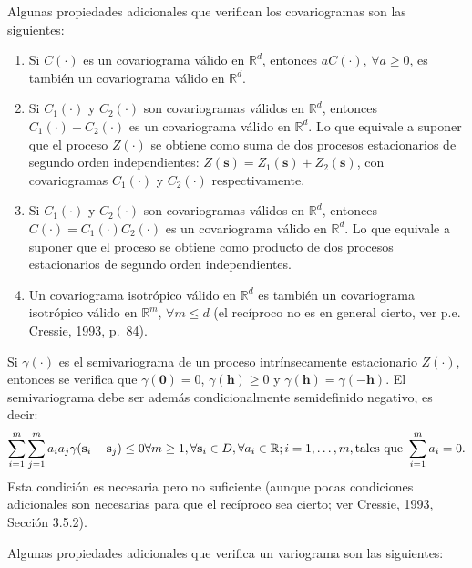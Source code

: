 \documentclass[
  spanish,
]{book}
\theoremstyle{break}
\theoremstyle{definition}
\theoremstyle{definition}
\theoremstyle{definition}
\theoremstyle{definition}
\theoremstyle{remark}
\begin{document}
Algunas propiedades adicionales que verifican los covariogramas son las siguientes:

\begin{enumerate}
\def\labelenumi{\arabic{enumi}.}
\item
  Si \(C(\cdot)\) es un covariograma válido en \(\mathbb{R}^d\), entonces \(aC(\cdot)\), \(\forall a\geq 0\), es
  también un covariograma válido en \(\mathbb{R}^d\).
\item
  Si \(C_1 (\cdot)\) y \(C_2 (\cdot)\) son covariogramas válidos en \(\mathbb{R}^d\), entonces \(C_1 (\cdot) + C_2 (\cdot)\) es un
  covariograma válido en \(\mathbb{R}^d\). Lo que equivale a suponer que el proceso \(Z(\cdot)\) se obtiene como suma de dos procesos estacionarios de segundo orden independientes: \(Z(\mathbf{s})=Z_1 (\mathbf{s}) + Z_2 (\mathbf{s})\), con covariogramas \(C_1 (\cdot)\) y \(C_2 (\cdot)\) respectivamente.
\item
  Si \(C_1 (\cdot)\) y \(C_2 (\cdot)\) son covariogramas válidos en \(\mathbb{R}^d\), entonces \(C(\cdot) = C_1 (\cdot)C_2 (\cdot)\)
  es un covariograma válido en \(\mathbb{R}^d\). Lo que equivale a suponer que el proceso se obtiene como producto de dos procesos estacionarios de segundo orden independientes.
\item
  Un covariograma isotrópico válido en \(\mathbb{R}^d\) es también un covariograma isotrópico válido en \(\mathbb{R}^m\), \(\forall m\leq d\) (el recíproco no es en general cierto, ver p.e. Cressie, 1993, p.~84).
\end{enumerate}

Si \(\gamma (\cdot)\) es el semivariograma de un proceso intrínsecamente estacionario \(Z(\cdot)\), entonces se verifica que \(\gamma (\mathbf{0})=0\), \(\gamma (\mathbf{h})\geq 0\) y \(\gamma (\mathbf{h})=\gamma (-\mathbf{h})\).
El semivariograma debe ser además condicionalmente semidefinido negativo, es decir:
\[\sum\limits_{i=1}^{m}\sum\limits_{j=1}^{m}a_i a_j \gamma(\mathbf{s}_i -\mathbf{s}_j) \leq 0  \\
\forall m\geq 1,\forall \mathbf{s}_i \in D,\forall a_i \in \mathbb{R};i=1, \ldots,m,\text{tales que } \sum\limits_{i=1}^{m}a_i = 0.\]
Esta condición es necesaria pero no suficiente (aunque pocas condiciones adicionales son necesarias para que el recíproco sea cierto; ver Cressie, 1993, Sección 3.5.2).

Algunas propiedades adicionales que verifica un variograma son las siguientes:
\end{document}
